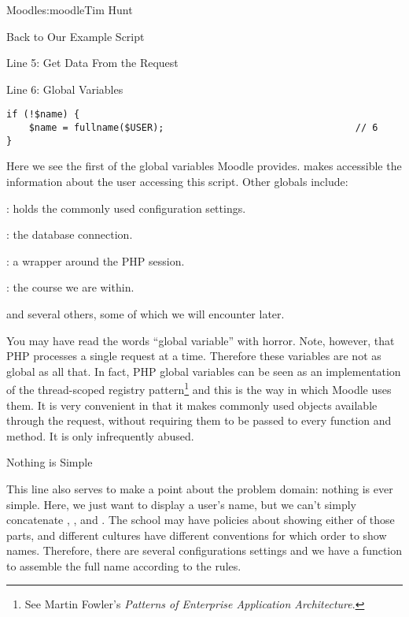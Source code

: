 \begin{aosachapter}{Moodle}{s:moodle}{Tim Hunt}
\begin{aosasect1}{Back to Our Example Script}
\begin{aosasect2}{Line 5: Get Data From the Request}
\end{aosasect2}

\begin{aosasect2}{Line 6: Global Variables}

\begin{verbatim}
if (!$name) {
    $name = fullname($USER);                                  // 6
}
\end{verbatim}

Here we see the first of the global variables Moodle
provides.  makes accessible the information about the
user accessing this script. Other globals include:

\begin{aosaitemize}

\item {}: holds the commonly used configuration settings.

\item {}: the database connection.

\item {}: a wrapper around the PHP session.

\item {}: the course we are within.

\end{aosaitemize}

\noindent
and several others, some of which we will encounter later.

You may have read the words ``global variable'' with horror. Note,
however, that PHP processes a single request at a time. Therefore
these variables are not as global as all that. In fact, PHP global
variables can be seen as an implementation of the thread-scoped
registry pattern\footnote{See Martin Fowler's \emph{Patterns of
Enterprise Application Architecture}.} and this is the way in which
Moodle uses them. It is very convenient in that it makes commonly used
objects available through the request, without requiring them to be
passed to every function and method. It is only infrequently abused.

\end{aosasect2}

\begin{aosasect2}{Nothing is Simple}

This line also serves to make a point about the problem
domain: nothing is ever simple. Here, we just want to display a user's
name, but we can't simply concatenate ,
, and . The school may have policies
about showing either of those parts, and different cultures have
different conventions for which order to show names. Therefore, there
are several configurations settings and we have a function to
assemble the full name according to the rules.


\end{aosasect2}
\end{aosasect1}
\end{aosachapter}
